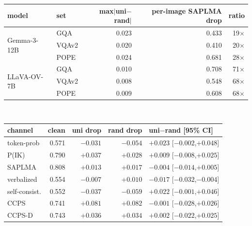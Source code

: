 \footnotesize
\setlength{\tabcolsep}{6pt}
\begin{tabular}{@{}llrrr@{}}
\toprule
model & set & max$|$uni$-$rand$|$ & per-image SAPLMA drop & ratio \\
\midrule
\multirow{3}{*}{Gemma-3-12B} & GQA & 0.023 & 0.433 & 19$\times$ \\
 & VQAv2 & 0.020 & 0.410 & 20$\times$ \\
 & POPE & 0.024 & 0.681 & 28$\times$ \\
\midrule
\multirow{3}{*}{LLaVA-OV-7B} & GQA & 0.010 & 0.708 & 71$\times$ \\
 & VQAv2 & 0.008 & 0.548 & 68$\times$ \\
 & POPE & 0.009 & 0.608 & 68$\times$ \\
\bottomrule
\end{tabular}

\vspace{8pt}
\\[2pt]
\footnotesize
\setlength{\tabcolsep}{6pt}
\begin{tabular}{@{}lrrrl@{}}
\toprule
channel & clean & uni drop & rand drop & uni$-$rand [95\% CI] \\
\midrule
token-prob & 0.571 & $-0.031$ & $-0.054$ & $+0.023$ {\scriptsize[$-0.002$,$+0.048$]} \\
P(IK) & 0.790 & $+0.037$ & $+0.028$ & $+0.009$ {\scriptsize[$-0.008$,$+0.025$]} \\
SAPLMA & 0.808 & $+0.013$ & $+0.017$ & $-0.004$ {\scriptsize[$-0.014$,$+0.005$]} \\
verbalized & 0.554 & $-0.007$ & $+0.010$ & $-0.017$ {\scriptsize[$-0.032$,$-0.004$]} \\
self-consist. & 0.552 & $-0.037$ & $-0.059$ & $+0.022$ {\scriptsize[$-0.001$,$+0.046$]} \\
CCPS & 0.741 & $+0.081$ & $+0.082$ & $-0.001$ {\scriptsize[$-0.028$,$+0.026$]} \\
CCPS-D & 0.743 & $+0.036$ & $+0.034$ & $+0.002$ {\scriptsize[$-0.022$,$+0.025$]} \\
\bottomrule
\end{tabular}

\vspace{3pt}

